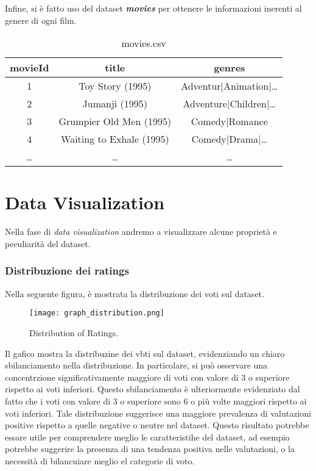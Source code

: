 \documentclass[../../Report.tex]{subfiles}
\begin{document}
Infine, si è fatto uso del dataset \textit{\textbf{movies}} per ottenere le informazioni inerenti al genere di ogni film.
\begin{table}[H]
    \centering
    \begin{tabular}{|c|c|c|}
        \hline
        \textbf{movieId} & \textbf{title}           & \textbf{genres}              \\
        \hline
        1                & Toy Story (1995)         & Adventur$|$Animation$|$\dots \\
        2                & Jumanji (1995)           & Adventure$|$Children$|$\dots \\
        3                & Grumpier Old Men (1995)  & Comedy$|$Romance             \\
        4                & Waiting to Exhale (1995) & Comedy$|$Drama$|$\dots       \\
        \dots            & \dots                    & \dots                        \\
        \hline
    \end{tabular}
    \caption{movies.csv}
    \label{tab:movies.csv}
\end{table}


\section{Data Visualization}
Nella fase di \textit{data visualization} andremo a visualizzare alcune proprietà e peculiarità del dataset.

\subsubsection{Distribuzione dei ratings}
Nella seguente figura, è mostrata la distribuzione dei voti sul dataset.
\begin{figure}[H]
    \centering
    \texttt{[image: graph\_distribution.png]}
    \caption{Distribution of Ratings.}
    \label{fig:ratings_distribution_graph}
\end{figure}
Il gafico mostra la distribuzine dei vbti sul dataset, evidenziando un chiaro sbilanciamento nella distribuzione. In particolare, si può osservare una concentrzione significativamente maggiore di voti con valore di 3 o superiore rispetto ai voti inferiori.
Questo sbilanciamento è ulteriormente evidenziato dal fatto che i voti con valore di 3 o superiore sono 6 o più volte maggiori rispetto ai voti inferiori.
Tale distribuzione suggerisce una maggiore prevalenza di valutazioni positive rispetto a quelle negative o neutre nel dataset.
Questo risultato potrebbe essare utile per comprendere meglio le caratteristihe del dataset, ad esempio potrebbe suggerire la presenza di una tendenza positiva nelle valutazioni, o la necessità di bilancuiare meglio el categorie di voto.
\end{document}
